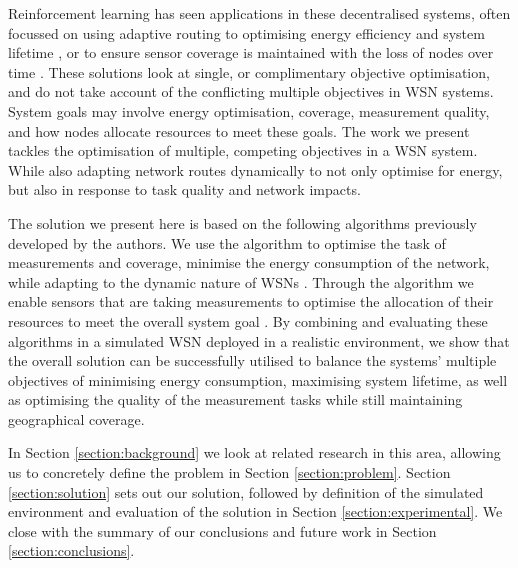 \ifdefined\DEBUG {} \else \fi
Reinforcement learning has seen applications in these decentralised systems, often focussed on using adaptive routing  to optimising energy efficiency and system lifetime \citep{ 10.1504/IJCNDS.2012.048871, Kulkarnib}, or to ensure sensor coverage is maintained with the loss of nodes over time \citep{Sharma2020}. These solutions look at single, or complimentary objective optimisation, and do not take account of the conflicting multiple objectives in WSN systems. System goals may involve energy optimisation, coverage, measurement quality, and how nodes allocate resources to meet these goals. The work we present tackles the optimisation of multiple, competing objectives in a WSN system. While also adapting network routes dynamically to not only optimise for energy, but also in response to task quality and network impacts.

\ifdefined\DEBUG {} \else \fi
The solution we present here is based on the following algorithms previously developed by the authors. We use the \acronymATARIA{}{} algorithm to optimise the task of measurements and coverage, minimise the energy consumption of the network, while adapting to the dynamic nature of WSNs \citep{creech2021dynamic}. Through the \acronymMGRAO{}{} algorithm we enable sensors that are taking measurements to optimise the allocation of their resources to meet the overall system goal \citep{creech2021resource}. By combining and evaluating these algorithms in a simulated WSN deployed in a realistic environment, we show that the overall solution can be successfully utilised to balance the systems' multiple objectives of minimising energy consumption, maximising system lifetime, as well as optimising the quality of the measurement tasks while still maintaining geographical coverage.

\ifdefined\DEBUG {} \else \fi
In Section \ref{section:background} we look at related research in this area, allowing us to concretely define the problem in Section \ref{section:problem}. Section \ref{section:solution} sets out our solution, followed by definition of the simulated environment and evaluation of the solution in Section \ref{section:experimental}. We close with the summary of our conclusions and future work in Section \ref{section:conclusions}.

